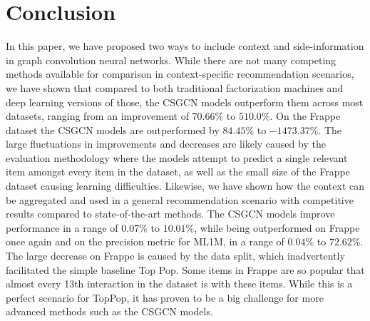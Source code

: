 \section{Conclusion}\label{sec:conclusion}
In this paper, we have proposed two ways to include context and side-information in graph convolution neural networks.
While there are not many competing methods available for comparison in context-specific recommendation scenarios, we have shown that compared to both traditional factorization machines and deep learning versions of those, the CSGCN models outperform them across most datasets, ranging from an improvement of $70.66\%$ to $510.0\%$.
On the Frappe dataset the CSGCN models are outperformed by $84.45\%$ to $-1473.37\%$.
The large fluctuations in improvements and decreases are likely caused by the evaluation methodology where the models attempt to predict a single relevant item amongst every item in the dataset, as well as the small size of the Frappe dataset causing learning difficulties.
Likewise, we have shown how the context can be aggregated and used in a general recommendation scenario with competitive results compared to state-of-the-art methods.
The CSGCN models improve performance in a range of $0.07\%$ to $10.01\%$, while being outperformed on Frappe once again and on the precision metric for ML1M, in a range of $0.04\%$ to $72.62\%$.
The large decrease on Frappe is caused by the data split, which inadvertently facilitated the simple baseline Top Pop.
Some items in Frappe are so popular that almost every 13th interaction in the dataset is with these items.
While this is a perfect scenario for TopPop, it has proven to be a big challenge for more advanced methods such as the CSGCN models.


